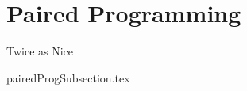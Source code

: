 \documentclass[class=book , crop=false]{standalone}
\begin{document}
	\section{Paired Programming}Twice as Nice

		{pairedProgSubsection.tex}
		
\end{document}
